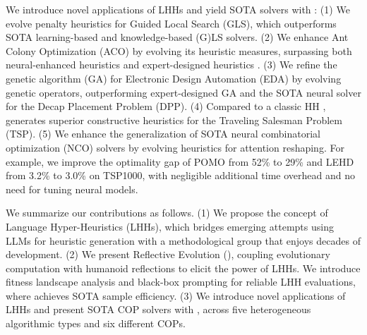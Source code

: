 We introduce novel applications of LHHs and yield SOTA solvers with \our{}: (1) We evolve penalty heuristics for Guided Local Search (GLS), which outperforms SOTA learning-based \cite{ma2023neu_kopt, hudson2022_gnn_gls, sui2023neuralgls} and knowledge-based \cite{arnold2019_KGLS_VRP} (G)LS solvers. (2) We enhance Ant Colony Optimization (ACO) by evolving its heuristic measures, surpassing both neural-enhanced heuristics \cite{ye2023deepaco} and expert-designed heuristics \cite{skinderowicz2022_aco_tsp_human_bl, cai2022_aco_cvrp_human_bl, sohrabi2021_aco_op_human_bl, fidanova2020_aco_mkp_human_bl, levine2004_aco_bpp_human_bl}. (3) We refine the genetic algorithm (GA) for Electronic Design Automation (EDA) by evolving genetic operators, outperforming expert-designed GA \citep{park2023versatile} and the SOTA neural solver \citep{kim2023devformer} for the Decap Placement Problem (DPP). (4) Compared to a classic HH \cite{duflo2019gp_hh_tsp}, \our{} generates superior constructive heuristics for the Traveling Salesman Problem (TSP). (5) We enhance the generalization of SOTA neural combinatorial optimization (NCO) solvers \cite{kwon2020pomo,luo2023nco_heavy_decoder} by evolving heuristics for attention reshaping. For example, we improve the optimality gap of POMO \cite{kwon2020pomo} from 52\% to 29\% and LEHD \cite{luo2023nco_heavy_decoder} from 3.2\% to 3.0\% on TSP1000, with negligible additional time overhead and no need for tuning neural models.


We summarize our contributions as follows. (1) We propose the concept of Language Hyper-Heuristics (LHHs), which bridges emerging attempts using LLMs for heuristic generation with a methodological group that enjoys decades of development. (2) We present Reflective Evolution (\our{}), coupling evolutionary computation with humanoid reflections to elicit the power of LHHs. We introduce fitness landscape analysis and black-box prompting for reliable LHH evaluations, where \our{} achieves SOTA sample efficiency. (3) We introduce novel applications of LHHs and present SOTA COP solvers with \our{}, across five heterogeneous algorithmic types and six different COPs.